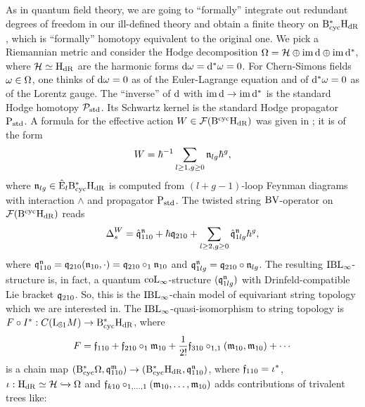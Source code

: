 \documentclass[\MainFolder/Text.tex]{subfiles}
\begin{document}
As in quantum field theory, we are going to ``formally'' integrate out redundant degrees of freedom in our ill-defined theory and obtain a finite theory on $\mathrm{B}_{\mathrm{cyc}}^*\mathrm{H}_{\mathrm{dR}}$, which is ``formally'' homotopy equivalent to the original one. We pick a Riemannian metric and consider the Hodge decomposition $\Omega = \mathcal{H} \oplus \operatorname{im}\mathrm{d} \oplus \operatorname{im}\mathrm{d}^*$, where $\mathcal{H} \simeq \mathrm{H}_{\mathrm{dR}}$ are the harmonic forms $\mathrm{d} \omega = \mathrm{d}^* \omega = 0$. For Chern-Simons fields $\omega\in \Omega$, one thinks of $\mathrm{d} \omega = 0$ as of the Euler-Lagrange equation and of $\mathrm{d}^* \omega = 0$ as of the Lorentz gauge. The ``inverse'' of $\mathrm{d}$ with $\operatorname{im}\mathrm{d} \rightarrow \operatorname{im} \mathrm{d}^*$ is the standard Hodge homotopy $\mathcal{P}_{\mathrm{std}}$. Its Schwartz kernel is the standard Hodge propagator $\mathrm{P}_{\mathrm{std}}$. A formula for the effective action $W\in\mathcal{F}(\mathrm{B}^{\mathrm{cyc}}\mathrm{H}_{\mathrm{dR}})$ was given in \cite{Cieliebak2015}; it is of the form
$$ W = \hbar^{-1}\sum_{l\ge 1, g\ge 0} \mathfrak{n}_{lg} \hbar^{g}, $$
where $\mathfrak{n}_{lg} \in \hat{\mathrm{E}}_l \mathrm{B}_{\mathrm{cyc}}^*\mathrm{H}_{\mathrm{dR}}$ is computed from $(l+g-1)$-loop Feynman diagrams with interaction $\wedge$ and propagator $\mathrm{P}_{\mathrm{std}}$. The twisted string $\mathrm{BV}$-operator on $\mathcal{F}(\mathrm{B}^{\mathrm{cyc}}\mathrm{H}_{\mathrm{dR}})$ reads
$$ \operatorname{\Delta}^W_s = \hat{\mathfrak{q}}^{\mathfrak{n}}_{110}  +  \hbar{\mathfrak{q}}_{210} + \sum_{l\ge 2, g\ge 0} \hat{\mathfrak{q}}^{\mathfrak{n}}_{1lg} \hbar^{g}, $$
where $\mathfrak{q}_{110}^{\mathfrak{n}} = \mathfrak{q}_{210}(\mathfrak{n}_{10},\cdot) = \mathfrak{q}_{210}\circ_1 \mathfrak{n}_{10}$ and $\mathfrak{q}_{1lg}^{\mathfrak{n}} = \mathfrak{q}_{210}\circ \mathfrak{n}_{lg}$. The resulting $\mathrm{IBL}_\infty$-structure is, in fact, a quantum $\mathrm{coL}_\infty$-structure $(\mathfrak{q}_{1lg}^{\mathfrak{n}})$ with Drinfeld-compatible Lie bracket $\mathfrak{q}_{210}$. So, this is the $\mathrm{IBL}_\infty$-chain model of equivariant string topology which we are interested in. The $\mathrm{IBL}_\infty$-quasi-isomorphism to string topology is $F\circ I^*: C(\mathrm{L}_{\mathbb{S}{1}} M) \rightarrow \mathrm{B}_{\mathrm{cyc}}^* \mathrm{H}_{\mathrm{dR}}$, where 
$$ F = \mathfrak{f}_{110} + \mathfrak{f}_{210}\circ_1 \mathfrak{m}_{10} + \frac{1}{2!} \mathfrak{f}_{310}\circ_{1,1}(\mathfrak{m}_{10},\mathfrak{m}_{10}) + \dotsb  $$
is a chain map $(\mathrm{B}_{\mathrm{cyc}}^* \Omega,\mathfrak{q}_{110}^{\mathfrak{m}}) \rightarrow (\mathrm{B}_{\mathrm{cyc}}^* \mathrm{H}_{\mathrm{dR}},\mathfrak{q}_{110}^{\mathfrak{n}})$, where $\mathfrak{f}_{110} = \iota^*$, $\iota: \mathrm{H}_{\mathrm{dR}}\simeq \mathcal{H} \xhookrightarrow{} \Omega$ and $\mathfrak{f}_{k10}\circ_{1,\dotsc,1}(\mathfrak{m}_{10},\dotsc,\mathfrak{m}_{10})$ adds contributions of trivalent trees like:
\end{document}
